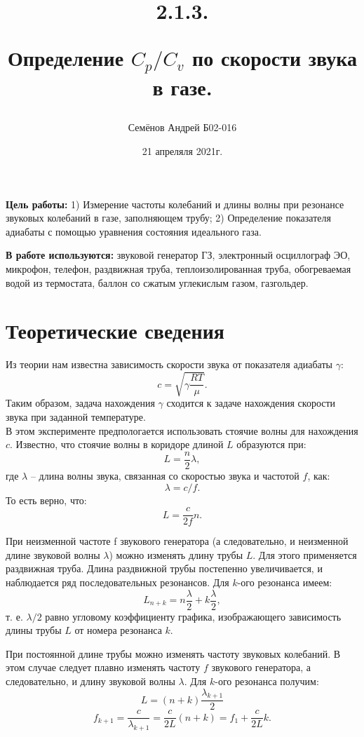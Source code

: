 \documentclass[12pt,a4paper]{article}
\begin{document}
\title{
2.1.3.

Определение $C_p/C_v$ по скорости звука в газе.
\author{Семёнов Андрей Б02-016}
}
\date{21 апреляля 2021г.}

\maketitle

\newpage


\textbf{Цель работы:} 1) Измерение частоты колебаний и длины волны при резонансе звуковых колебаний в газе, заполняющем трубу; 
2) Определение показателя адиабаты с помощью уравнения состояния идеального газа.

\textbf{В работе используются:} звуковой генератор ГЗ, электронный осциллограф ЭО, микрофон, телефон, раздвижная труба, теплоизолированная труба, обогреваемая водой из термостата, баллон со сжатым углекислым газом, газгольдер.

\section{Теоретические сведения}
Из теории нам известна зависимость скорости звука от показателя адиабаты $\gamma$:
$$c = \sqrt{\gamma\frac{RT}{\mu}}.$$
Таким образом, задача нахождения $\gamma$ сходится к задаче нахождения скорости звука при заданной температуре.\\
В этом эксперименте предпологается использовать стоячие волны для нахождения $c$. Известно, что стоячие волны в коридоре длиной $L$ образуются при:
$$L = \frac{n}{2}\lambda,$$
где $\lambda$ -- длина волны звука, связанная со скоростью звука и частотой $f$, как:
$$\lambda = c/f.$$
То есть верно, что:
$$L = \frac{c}{2f}n.$$

При неизменной частоте f звукового генератора (а следовательно, и неизменной длине звуковой волны $\lambda$) можно изменять длину трубы $L$. Для этого применяется раздвижная труба. Длина раздвижной трубы постепенно увеличивается, и наблюдается ряд последовательных резонансов. Для $k$-ого резонанса имеем:
$$L_{n+k}=n\frac{\lambda}{2} + k\frac{\lambda}{2},$$
т. е. $\lambda/2$ равно угловому коэффициенту графика, изображающего зависимость длины трубы $L$ от номера резонанса $k$.
		
При постоянной длине трубы можно изменять частоту звуковых колебаний. В этом случае следует плавно изменять частоту $f$ звукового генератора, а следовательно, и длину звуковой волны $\lambda$.
Для $k$-ого резонанса получим:
$$L = (n+k)\frac{\lambda_{k+1}}{2}$$
$$f_{k+1} = \frac{c}{\lambda_{k+1}}=\frac{c}{2L}(n+k)=f_1 + \frac{c}{2L}k.$$
		
\end{document}
